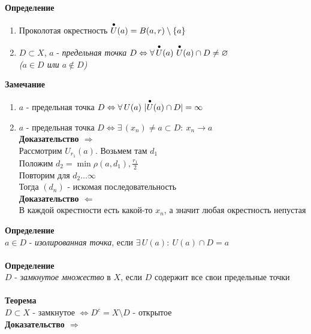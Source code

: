 \documentclass[12pt]{article}
\begin{document}
\textbf{Определение}
\begin{enumerate}
    \item Проколотая окрестность $\overset{\bullet}{U}(a)=B(a,r)\setminus \{a\}$
    \item $D\subset X$, $a$ - \textit{предельная точка} $D \Leftrightarrow \forall\,\overset{\bullet}{U}(a)\ \overset{\bullet}{U}(a)\cap D \neq \varnothing$\\
    \textit{($a \in D$ или $a\notin D$)}
\end{enumerate}
\textbf{Замечание}
\begin{enumerate}
    \item $a$ - предельная точка $D \Leftrightarrow \forall\,U(a)\ |\overset{\bullet}{U}(a)\cap D| = \infty$
    \item $a$ - предельная точка $D \Leftrightarrow \exists\,(x_n)\neq a \subset D:\ x_n\rightarrow a$\\
    \textbf{Доказательство $\Rightarrow$}\\
    Рассмотрим $U_{r_1}(a)$. Возьмем там $d_1$\\
    Положим $d_2 = \min \rho(a,d_1), \frac {r_1}2$\\
    Повторим для $d_2\ldots\infty$\\
    Тогда $(d_n)$ - искомая последовательность\\
    \textbf{Доказательство $\Leftarrow$}\\
    В каждой окрестности есть какой-то $x_n$, а значит любая окрестность непустая
\end{enumerate}
\textbf{Определение}\\
$a\in D$ - \textit{изолированная точка}, если $\exists\,U(a):\ U(a)\cap D = {a}$\\\\
\textbf{Определение}\\
$D$ - \textit{замкнутое множество} в $X$, если $D$ содержит все свои предельные точки\\\\
\textbf{Теорема}\\
$D\subset X$ - замкнутое $\Leftrightarrow D^c=X\setminus D$ - открытое\\
\textbf{Доказательство $\Rightarrow$}\\
\end{document}

